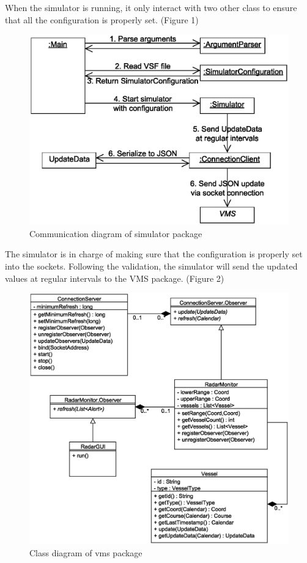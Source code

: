 \documentclass{article}
\begin{document}
\vspace{1cm}

When the simulator is running, it only interact with two other class to ensure that all the configuration is properly set. (Figure 1)

\break

\begin{figure}[h]
\caption{Communication diagram of simulator package}
\centering
\includegraphics[scale=0.3]{diagrams/simulator-communication-diagram.eps}
\end{figure}

\vspace{1cm}

The simulator is in charge of making sure that the configuration is properly set into the sockets. Following the validation, the simulator will send the updated values at regular intervals to the VMS package.
(Figure 2)

\begin{figure}[h]	
\caption{Class diagram of vms package}
\centering
\includegraphics[scale=0.3]{diagrams/vms-class-diagram.eps}
\end{figure}
\end{document}
